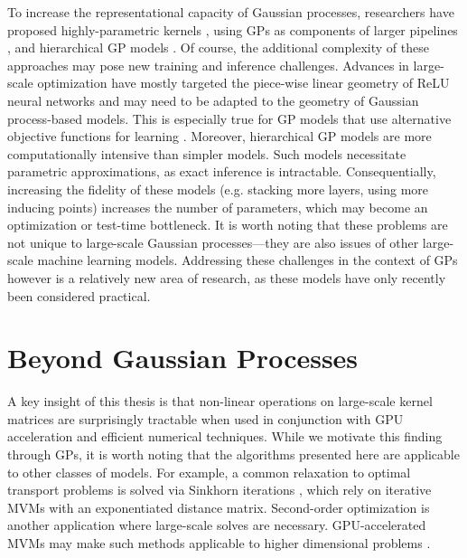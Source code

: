To increase the representational capacity of Gaussian processes, researchers have proposed highly-parametric kernels \cite{wilson2013gaussian,wilson2016stochastic}, using GPs as components of larger pipelines \cite{schulam2015framework,futoma2017learning}, and hierarchical GP models \cite{wilson2012gaussian,salimbeni2017doubly,jankowiak2020deep}.
Of course, the additional complexity of these approaches may pose new training and inference challenges.
Advances in large-scale optimization have mostly targeted the piece-wise linear geometry of ReLU neural networks and may need to be adapted to the geometry of Gaussian process-based models.
This is especially true for GP models that use alternative objective functions for learning \cite{sheth2017excess,knoblauch2019generalized,jankowiak2020parametric}.
Moreover, hierarchical GP models are more computationally intensive than simpler models.
Such models necessitate parametric approximations, as exact inference is intractable.
Consequentially, increasing the fidelity of these models (e.g. stacking more layers, using more inducing points) increases the number of parameters, which may become an optimization or test-time bottleneck.
It is worth noting that these problems are not unique to large-scale Gaussian processes---they are also issues of other large-scale machine learning models.
Addressing these challenges in the context of GPs however is a relatively new area of research, as these models have only recently been considered practical.




\section{Beyond Gaussian Processes}

A key insight of this thesis is that non-linear operations on large-scale kernel matrices are surprisingly tractable when used in conjunction with GPU acceleration and efficient numerical techniques.
While we motivate this finding through GPs, it is worth noting that the algorithms presented here are applicable to other classes of models.
For example, a common relaxation to optimal transport problems is solved via Sinkhorn iterations \cite{cuturi2013sinkhorn}, which rely on iterative MVMs with an exponentiated distance matrix.
Second-order optimization is another application where large-scale solves are necessary.
GPU-accelerated MVMs may make such methods applicable to higher dimensional problems \cite{koh2017understanding}.

